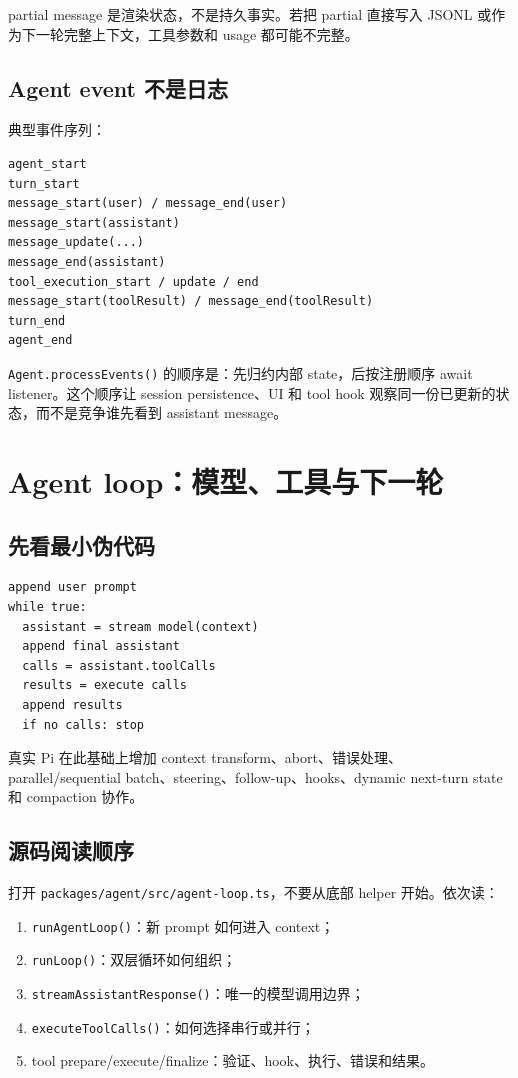 \documentclass[UTF8,openany,11pt]{ctexbook}
\newcommand{\pathref}[1]{\texttt{#1}}
\begin{document}
\begin{keypoint}
partial message 是渲染状态，不是持久事实。若把 partial 直接写入 JSONL 或作为下一轮完整上下文，工具参数和 usage 都可能不完整。
\end{keypoint}

\section{Agent event 不是日志}
典型事件序列：
\begin{Verbatim}[fontsize=\small]
agent_start
turn_start
message_start(user) / message_end(user)
message_start(assistant)
message_update(...)
message_end(assistant)
tool_execution_start / update / end
message_start(toolResult) / message_end(toolResult)
turn_end
agent_end
\end{Verbatim}
\texttt{Agent.processEvents()} 的顺序是：先归约内部 state，后按注册顺序 await listener。这个顺序让 session persistence、UI 和 tool hook 观察同一份已更新的状态，而不是竞争谁先看到 assistant message。

\chapter{Agent loop：模型、工具与下一轮}

\section{先看最小伪代码}
\begin{Verbatim}[fontsize=\small]
append user prompt
while true:
  assistant = stream model(context)
  append final assistant
  calls = assistant.toolCalls
  results = execute calls
  append results
  if no calls: stop
\end{Verbatim}
真实 Pi 在此基础上增加 context transform、abort、错误处理、parallel/sequential batch、steering、follow-up、hooks、dynamic next-turn state 和 compaction 协作。

\section{源码阅读顺序}
打开 \pathref{packages/agent/src/agent-loop.ts}，不要从底部 helper 开始。依次读：
\begin{enumerate}
\item \texttt{runAgentLoop()}：新 prompt 如何进入 context；
\item \texttt{runLoop()}：双层循环如何组织；
\item \texttt{streamAssistantResponse()}：唯一的模型调用边界；
\item \texttt{executeToolCalls()}：如何选择串行或并行；
\item tool prepare/execute/finalize：验证、hook、执行、错误和结果。
\end{enumerate}
\end{document}
